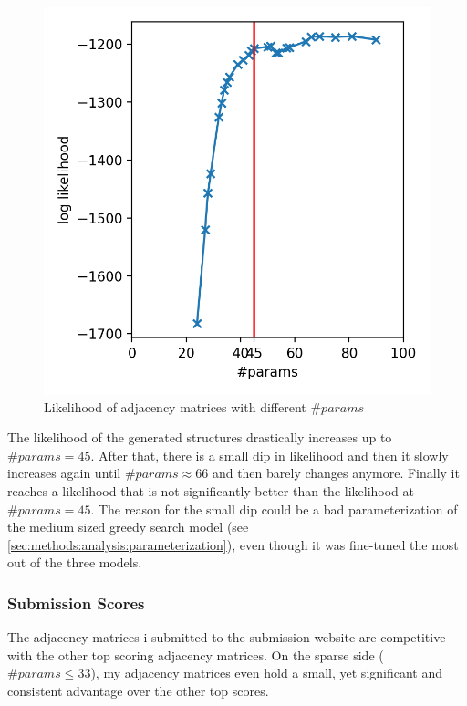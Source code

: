 \documentclass[sigconf, fleqn, prologue, dvipsnames]{acmart}
\begin{document}
\begin{figure}
	\centering
	\includegraphics[scale=0.5]{graphics/likelihoods.png}
	\caption{Likelihood of adjacency matrices with different $\#params$}
	\label{fig:results:likelihood}
\end{figure}

The likelihood of the generated structures drastically increases up to $\#params = 45$.
After that, there is a small dip in likelihood and then it slowly increases again until $\#params \approx 66$ and then barely changes anymore.
Finally it reaches a likelihood that is not significantly better than the likelihood at $\#params = 45$.
The reason for the small dip could be a bad parameterization of the medium sized greedy search model (see \autoref{sec:methods:analysis:parameterization}), even though it was fine-tuned the most out of the three models.

\subsubsection{Submission Scores}
The adjacency matrices i submitted to the submission website are competitive with the other top scoring adjacency matrices.
On the sparse side ($\#params \leq 33$), my adjacency matrices even hold a small, yet significant and consistent advantage over the other top scores.
\end{document}
